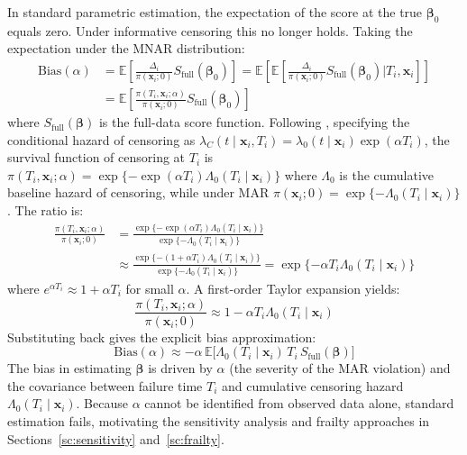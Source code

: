 \documentclass[twoside,11pt]{article}
\newcommand{\bx}{\mathbf{x}}
\begin{document}
In standard parametric estimation, the expectation of the score at the true $\boldsymbol{\beta}_0$ equals zero. Under informative censoring this no longer holds. Taking the expectation under the MNAR distribution:
\begin{align*}
    \mathrm{Bias}(\alpha)
    &= \mathbb{E} \left[ \frac{ \Delta_i }{\pi(\bx_i; 0)} S_\text{full}(\boldsymbol{\beta}_0) \right]
    = \mathbb{E} \left[ \mathbb{E} \left[ \frac{ \Delta_i  }{\pi(\bx_i; 0)} S_\text{full} (\boldsymbol{\beta}_0) \bigg| T_i, \bx_i \right] \right] \\
    &= \mathbb{E} \left[ \frac{\pi(T_i, \bx_i; \alpha)}{\pi(\bx_i; 0)} S_\text{full}(\boldsymbol{\beta}_0) \right]
\end{align*}
where $S_\text{full}(\boldsymbol{\beta})$ is the full-data score function. Following \citet{scharfstein1999}, specifying the conditional hazard of censoring as $\lambda_C(t \mid \bx_i, T_i) = \lambda_0(t \mid \bx_i)\exp(\alpha T_i)$, the survival function of censoring at $T_i$ is $\pi(T_i, \bx_i; \alpha) = \exp\{ - \exp(\alpha T_i) \Lambda_0(T_i \mid \bx_i) \}$ where $\Lambda_0$ is the cumulative baseline hazard of censoring, while under MAR $\pi(\bx_i; 0) = \exp\{ - \Lambda_0(T_i \mid \bx_i) \}$. The ratio is:
\begin{align*}
    \frac{\pi(T_i, \bx_i; \alpha)}{\pi(\bx_i; 0)}
    &= \frac{\exp\{ - \exp(\alpha T_i) \Lambda_0(T_i \mid \bx_i) \}}{\exp\{ - \Lambda_0(T_i \mid \bx_i) \}} \\
    &\approx \frac{\exp\{ - (1 + \alpha T_i) \Lambda_0(T_i \mid \bx_i) \}}{\exp\{ - \Lambda_0(T_i \mid \bx_i) \}}
     = \exp\{ - \alpha T_i \Lambda_0(T_i \mid \bx_i) \}
\end{align*}
where $e^{\alpha T_i} \approx 1 + \alpha T_i$ for small $\alpha$. A first-order Taylor expansion yields:
\begin{equation}
    \frac{\pi(T_i, \bx_i; \alpha)}{\pi(\bx_i; 0)} \approx 1 - \alpha T_i \Lambda_0(T_i \mid \bx_i)
\end{equation}
Substituting back gives the explicit bias approximation:
\begin{equation} \label{eq:bias-approx}
    \text{Bias}(\alpha) \approx -\alpha \, \mathbb{E} \Big[ \Lambda_0(T_i \mid \bx_i) \, T_i \, S_\text{full}(\boldsymbol{\beta}) \Big]
\end{equation}
The bias in estimating $\boldsymbol{\beta}$ is driven by $\alpha$ (the severity of the MAR violation) and the covariance between failure time $T_i$ and cumulative censoring hazard $\Lambda_0(T_i \mid \bx_i)$. Because $\alpha$ cannot be identified from observed data alone, standard estimation fails, motivating the sensitivity analysis and frailty approaches in Sections~\ref{sc:sensitivity} and~\ref{sc:frailty}.
\end{document}
